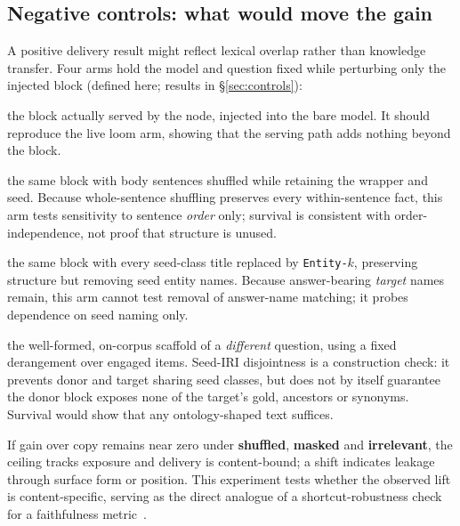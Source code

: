 \documentclass[10pt,twocolumn]{article}
\begin{document}
\subsection{Negative controls: what would move the gain}\label{sec:ceiling-controls}
A positive delivery result might reflect lexical overlap rather than knowledge transfer. Four arms hold the model and question fixed while perturbing only the injected block (defined here; results in \S\ref{sec:controls}):
\begin{description}[topsep=2pt,itemsep=1pt,leftmargin=0pt,font=\normalfont\itshape]
\item[true] the block actually served by the node, injected into the bare model. It should reproduce the live loom arm, showing that the serving path adds nothing beyond the block.
\item[shuffled] the same block with body sentences shuffled while retaining the wrapper and seed. Because whole-sentence shuffling preserves every within-sentence fact, this arm tests sensitivity to sentence \emph{order} only; survival is consistent with order-independence, not proof that structure is unused.
\item[masked] the same block with every seed-class title replaced by \texttt{Entity-$k$}, preserving structure but removing seed entity names. Because answer-bearing \emph{target} names remain, this arm cannot test removal of answer-name matching; it probes dependence on seed naming only.
\item[irrelevant] the well-formed, on-corpus scaffold of a \emph{different} question, using a fixed derangement over engaged items. Seed-IRI disjointness is a construction check: it prevents donor and target sharing seed classes, but does not by itself guarantee the donor block exposes none of the target's gold, ancestors or synonyms. Survival would show that any ontology-shaped text suffices.
\end{description}
If gain over copy remains near zero under \textbf{shuffled}, \textbf{masked} and \textbf{irrelevant}, the ceiling tracks exposure and delivery is content-bound; a shift indicates leakage through surface form or position. This experiment tests whether the observed lift is content-specific, serving as the direct analogue of a shortcut-robustness check for a faithfulness metric~\cite{gao2023alce}.
\end{document}
